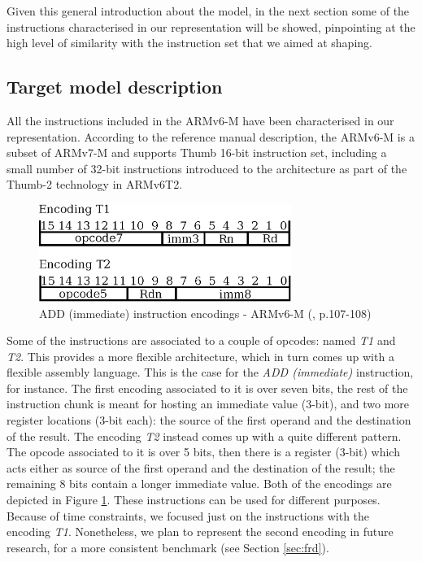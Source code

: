 \documentclass[conference]{IEEEtran}
\begin{document}
Given this general introduction about the model, in the next section some of the instructions
characterised in our representation will be showed, pinpointing at the high level of
similarity with the instruction set that we aimed at shaping.

\subsection{Target model description}
All the instructions included in the ARMv6-M have been characterised in our representation.
According to the reference manual description, the ARMv6-M is a subset of ARMv7-M and
supports Thumb 16-bit instruction set, including a small number of 32-bit instructions
introduced to the architecture as part of the Thumb-2 technology in ARMv6T2. 

\begin{figure}[ht!]
\begin{center}
	\includegraphics[width=8.2cm]{IMG/encodings.eps}
	\caption{ADD (immediate) instruction encodings - ARMv6-M (\cite{armManual}, p.107-108)}
	\label{fig:ADDEnc}
\end{center}
\end{figure}

Some of the instructions are associated to a couple of opcodes: named \textit{T1} and
\textit{T2}. This provides a more flexible architecture, which in turn comes up with a
flexible assembly language. This is the case for the \textit{ADD (immediate)} instruction,
for instance. The first encoding associated to it is over seven bits, the rest of the
instruction chunk is meant for hosting an immediate value (3-bit), and two more register
locations (3-bit each): the source of the first operand and the destination of the result.
The encoding \textit{T2} instead comes up with a quite different pattern. The opcode
associated to it is over 5 bits, then there is a register (3-bit) which acts either as source
of the first operand and the destination of the result; the remaining 8 bits contain a longer
immediate value. Both of the encodings are depicted in Figure \ref{fig:ADDEnc}. These
instructions can be used for different purposes. Because of time constraints, we focused just
on the instructions with the encoding \textit{T1}. Nonetheless, we plan to represent the
second encoding in future research, for a more consistent benchmark (see Section
\ref{sec:frd}).
\end{document}
